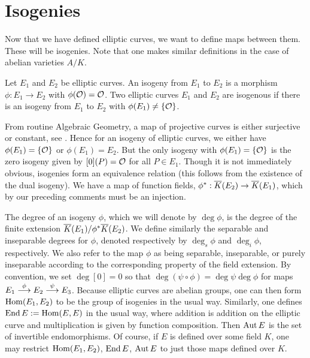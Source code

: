 \section{Isogenies\label{sec:isog}}

Now that we have defined elliptic curves, we want to define maps between them. These will be isogenies. Note that one makes similar definitions in the case of abelian varieties $A/K$. 


\begin{dfn}
Let $E_1$ and $E_2$ be elliptic curves. An isogeny from $E_1$ to $E_2$ is a morphism $\phi: E_1 \to E_2$ with $\phi(\mathcal{O})= \mathcal{O}$. Two elliptic curves $E_1$ and $E_2$ are isogenous if there is an isogeny from $E_1$ to $E_2$ with $\phi(E_1) \neq \{ \mathcal{O} \}$. 
\end{dfn}


From routine Algebraic Geometry, a map of projective curves is either surjective or constant, see \cite[II.2.3]{silvermanarithmetic}. Hence for an isogeny of elliptic curves, we either have $\phi(E_1)= \{ \mathcal{O} \}$ or $\phi(E_1)= E_2$. But the only isogeny with $\phi(E_1)= \{ \mathcal{O} \}$ is the zero isogeny given by $[0](P)= \mathcal{O}$ for all $P \in E_1$. Though it is not immediately obvious, isogenies form an equivalence relation (this follows from the existence of the dual isogeny). We have a map of function fields, $\phi^*: \overline{K}(E_2) \to \overline{K}(E_1)$, which by our preceding comments must be an injection.  


The degree of an isogeny $\phi$, which we will denote by $\deg \phi$, is the degree of the finite extension $\overline{K}(E_1)/\phi^*\overline{K}(E_2)$. We define similarly the separable and inseparable degrees for $\phi$, denoted respectively by $\deg_s \phi$ and $\deg_i \phi$, respectively. We also refer to the map $\phi$ as being separable, inseparable, or purely inseparable according to the corresponding property of the field extension. By convention, we set $\deg [0]= 0$ so that $\deg(\psi \circ \phi)= \deg \psi \deg \phi$ for maps $E_1 \stackrel{\phi}{\longrightarrow} E_2 \stackrel{\psi}{\longrightarrow} E_3$. Because elliptic curves are abelian groups, one can then form $\operatorname{Hom}(E_1, E_2)$ to be the group of isogenies in the usual way. Similarly, one defines $\operatorname{End} E:= \operatorname{Hom}(E, E)$ in the usual way, where addition is addition on the elliptic curve and multiplication is given by function composition. Then $\operatorname{Aut} E$ is the set of invertible endomorphisms. Of course, if $E$ is defined over some field $K$, one may restrict $\operatorname{Hom}(E_1, E_2)$, $\operatorname{End} E$, $\operatorname{Aut} E$ to just those maps defined over $K$. 


